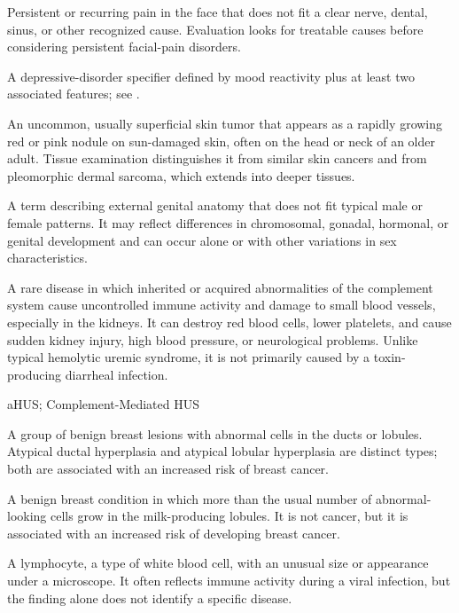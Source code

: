  Persistent or recurring pain in the face that does not fit a clear nerve, dental, sinus, or other recognized cause. Evaluation looks for treatable causes before considering persistent facial-pain disorders.

 A depressive-disorder specifier defined by mood reactivity plus at least two associated features; see .

 An uncommon, usually superficial skin tumor that appears
as a rapidly growing red or pink nodule on sun-damaged skin, often on the head or neck of an
older adult. Tissue examination distinguishes it from similar skin cancers and from
pleomorphic dermal sarcoma, which extends into deeper tissues.

 A term describing external genital anatomy that does not fit
typical male or female patterns. It may reflect differences in chromosomal, gonadal, hormonal,
or genital development and can occur alone or with other variations in sex characteristics.

 A rare disease in which inherited or acquired abnormalities of the complement system cause uncontrolled immune activity and damage to small blood vessels, especially in the kidneys. It can destroy red blood cells, lower platelets, and cause sudden kidney injury, high blood pressure, or neurological problems. Unlike typical hemolytic uremic syndrome, it is not primarily caused by a toxin-producing diarrheal infection.

\synonyms
aHUS; Complement-Mediated HUS

 A group of benign breast lesions with abnormal cells in the ducts or lobules. Atypical ductal hyperplasia and atypical lobular hyperplasia are distinct types; both are associated with an increased risk of breast cancer.

 A benign breast condition in which more than the usual number of abnormal-looking cells grow in the milk-producing lobules. It is not cancer, but it is associated with an increased risk of developing breast cancer.

 A lymphocyte, a type of white blood cell, with an unusual size or appearance under a microscope. It often reflects immune activity during a viral infection, but the finding alone does not identify a specific disease.

